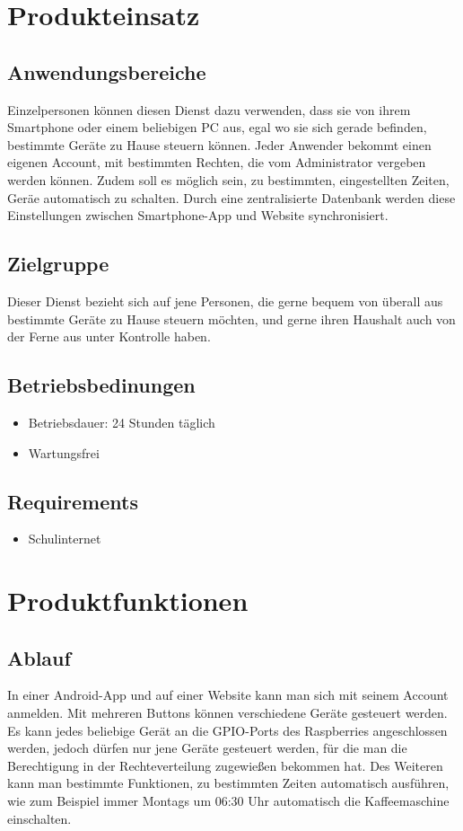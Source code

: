\documentclass[10pt,a4paper]{report}
\begin{document}
\section{Produkteinsatz}
\subsection{Anwendungsbereiche}
Einzelpersonen können diesen Dienst dazu verwenden, dass sie von ihrem Smartphone oder einem beliebigen PC aus, egal wo sie sich gerade befinden, bestimmte Geräte zu Hause steuern können. Jeder Anwender bekommt einen eigenen Account, mit bestimmten Rechten, die vom Administrator vergeben werden können.
Zudem soll es möglich sein, zu bestimmten, eingestellten Zeiten, Geräe automatisch zu schalten. Durch eine zentralisierte Datenbank werden diese Einstellungen zwischen Smartphone-App und Website synchronisiert.

\subsection{Zielgruppe}
Dieser Dienst bezieht sich auf jene Personen, die gerne bequem von überall aus bestimmte Geräte zu Hause steuern möchten, und gerne ihren Haushalt auch von der Ferne aus unter Kontrolle haben.


\subsection{Betriebsbedinungen}
\begin{itemize}
\item Betriebsdauer: 24 Stunden täglich
\item Wartungsfrei
\end{itemize}

\subsection{Requirements}
\begin{itemize}
\item Schulinternet
\end{itemize}

\section{Produktfunktionen}
\subsection{Ablauf}
In einer Android-App und auf einer Website kann man sich mit seinem Account anmelden. Mit mehreren Buttons können verschiedene Geräte gesteuert werden. Es kann jedes beliebige Gerät an die GPIO-Ports des Raspberries angeschlossen werden, jedoch dürfen nur jene Geräte gesteuert werden, für die man die Berechtigung in der Rechteverteilung zugewießen bekommen hat. Des Weiteren kann man bestimmte Funktionen, zu bestimmten Zeiten automatisch ausführen, wie zum Beispiel immer Montags um 06:30 Uhr automatisch die Kaffeemaschine einschalten.
\end{document}
